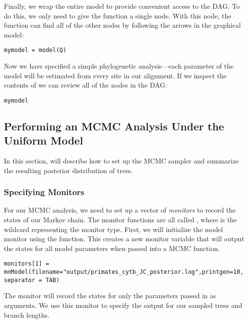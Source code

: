 Finally, we wrap the entire model to provide convenient access to the DAG. 
To do this, we only need to give the  function a single node. 
With this node, the  function can find all of the other nodes by following the arrows in the graphical model:
{\tt \begin{snugshade*}
\begin{lstlisting}
mymodel = model(Q)
\end{lstlisting}
\end{snugshade*}}

Now we have specified a simple phylogenetic analysis---each parameter of the model will be estimated from every site in our alignment.
If we inspect the contents of  we can review all of the nodes in the DAG:
{\tt \begin{snugshade*}
\begin{lstlisting}
mymodel
\end{lstlisting}
\end{snugshade*}}

\bigskip
\subsection{Performing an MCMC Analysis Under the Uniform Model}

In this section, will describe how to set up the MCMC sampler and summarize the resulting posterior distribution of trees. 

\subsubsection{Specifying Monitors}

For our MCMC analysis, we need to set up a vector of \textit{monitors} to record the states of our Markov chain. 
The monitor functions are all called , where \cl{*} is the wildcard representing the monitor type.
First, we will initialize the model monitor using the  function. This creates a new monitor variable that will output the states for all model parameters when passed into a MCMC function. 
{\tt \begin{snugshade*}
\begin{lstlisting}
monitors[1] = mnModel(filename="output/primates_cytb_JC_posterior.log",printgen=10, separator = TAB)
\end{lstlisting}
\end{snugshade*}}

The  monitor will record the states for only the parameters passed in as arguments. We use this monitor to specify the output for our sampled trees and branch lengths.

